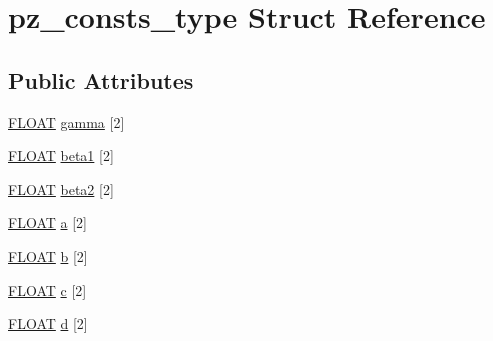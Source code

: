 \hypertarget{structpz__consts__type}{\section{pz\-\_\-consts\-\_\-type Struct Reference}
\label{structpz__consts__type}
}
\subsection*{Public Attributes}
\begin{DoxyCompactItemize}
\item 
\hyperlink{src_2xc__config_8h_ae8690abbffa85934d64d545920e2b108}{F\-L\-O\-A\-T} \hyperlink{structpz__consts__type_adddb0f678c3bc067875045d272a8af11}{gamma} \mbox{[}2\mbox{]}
\item 
\hyperlink{src_2xc__config_8h_ae8690abbffa85934d64d545920e2b108}{F\-L\-O\-A\-T} \hyperlink{structpz__consts__type_a6a7623fba68d04de4f9295ce77c72a5a}{beta1} \mbox{[}2\mbox{]}
\item 
\hyperlink{src_2xc__config_8h_ae8690abbffa85934d64d545920e2b108}{F\-L\-O\-A\-T} \hyperlink{structpz__consts__type_ad539aef053aa325b8a2ee145fd566c12}{beta2} \mbox{[}2\mbox{]}
\item 
\hyperlink{src_2xc__config_8h_ae8690abbffa85934d64d545920e2b108}{F\-L\-O\-A\-T} \hyperlink{structpz__consts__type_a420d956a3219d2e77d90f8fa12c64735}{a} \mbox{[}2\mbox{]}
\item 
\hyperlink{src_2xc__config_8h_ae8690abbffa85934d64d545920e2b108}{F\-L\-O\-A\-T} \hyperlink{structpz__consts__type_ad5f2456bb19894ea47428c830745c031}{b} \mbox{[}2\mbox{]}
\item 
\hyperlink{src_2xc__config_8h_ae8690abbffa85934d64d545920e2b108}{F\-L\-O\-A\-T} \hyperlink{structpz__consts__type_a5825a9be1a3dcd0b1ce88eb2c329e255}{c} \mbox{[}2\mbox{]}
\item 
\hyperlink{src_2xc__config_8h_ae8690abbffa85934d64d545920e2b108}{F\-L\-O\-A\-T} \hyperlink{structpz__consts__type_a3da4a99c0a5b9ea99c9f29da7def66f7}{d} \mbox{[}2\mbox{]}
\end{DoxyCompactItemize}


